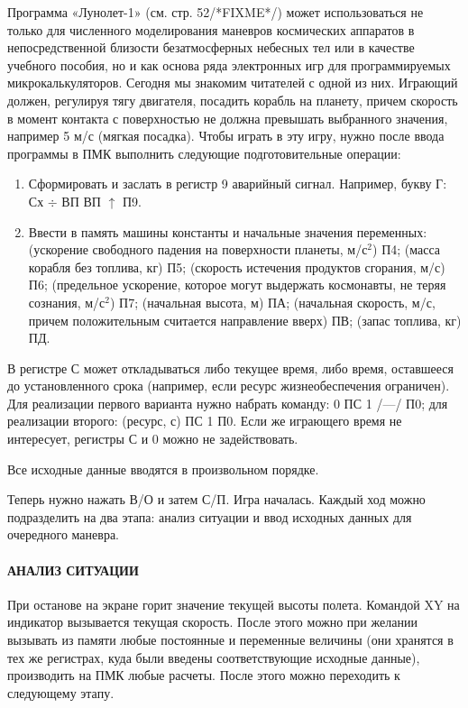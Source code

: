\documentclass[11pt,a4paper,oneside]{article}
\begin{document}
Программа «Лунолет-1» (см. стр. 52/*FIXME*/) может использоваться не только для численного моделирования маневров космических аппаратов в непосредственной близости безатмосферных небесных тел или в качестве учебного пособия, но и как основа ряда электронных игр для программируемых микрокалькуляторов. Сегодня мы знакомим читателей с одной из них. Играющий должен, регулируя тягу двигателя, посадить корабль на планету, причем скорость в момент контакта с поверхностью не должна превышать выбранного значения, например 5 м/с (мягкая посадка). Чтобы играть в эту игру, нужно после ввода программы в ПМК выполнить следующие подготовительные операции:
\begin{enumerate}
\item Сформировать и заслать в регистр 9 аварийный сигнал. Например, букву Г: Сх $\div$ ВП ВП $\uparrow$ П9.
\item Ввести в память машины константы и начальные значения переменных: (ускорение свободного падения на поверхности планеты, м/с$^{2}$) П4; (масса корабля без топлива, кг) П5; (скорость истечения продуктов сгорания, м/с) П6; (предельное ускорение, которое могут выдержать космонавты, не теряя сознания, м/с$^{2}$) П7; (начальная высота, м) ПА; (начальная скорость, м/с, причем положительным считается направление вверх) ПВ; (запас топлива, кг) ПД.
\end{enumerate}

В регистре С может откладываться либо текущее время, либо время, оставшееся до установленного срока (например, если ресурс жизнеобеспечения ограничен). Для реализации первого варианта нужно набрать команду: 0 ПС 1 /—/ П0; для реализации второго: (ресурс, с) ПС 1 П0. Если же играющего время не интересует, регистры С и 0 можно не задействовать.

Все исходные данные вводятся в произвольном порядке.

Теперь нужно нажать В/О и затем С/П. Игра началась. Каждый ход можно подразделить на два этапа: анализ ситуации и ввод исходных данных для очередного маневра.

\paragraph{АНАЛИЗ СИТУАЦИИ}
При останове на экране горит значение текущей высоты полета. Командой XY на индикатор вызывается текущая скорость. После этого можно при желании вызывать из памяти любые постоянные и переменные величины (они хранятся в тех же регистрах, куда были введены соответствующие исходные данные), производить на ПМК любые расчеты. После этого можно переходить к следующему этапу.
\end{document}
